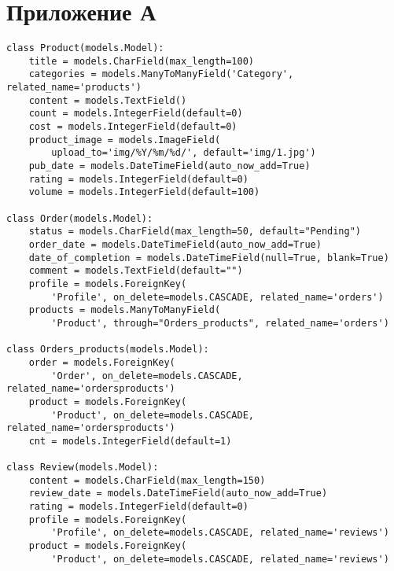\chapter*{Приложение А}

\captionsetup{singlelinecheck = false, justification=raggedright}
\begin{lstlisting}[label=db_create_1,caption=Классы таблиц базы данных(часть 1)]
class Product(models.Model):
    title = models.CharField(max_length=100)
    categories = models.ManyToManyField('Category', related_name='products')
    content = models.TextField()
    count = models.IntegerField(default=0)
    cost = models.IntegerField(default=0)
    product_image = models.ImageField(
        upload_to='img/%Y/%m/%d/', default='img/1.jpg')
    pub_date = models.DateTimeField(auto_now_add=True)
    rating = models.IntegerField(default=0)
    volume = models.IntegerField(default=100)
 
class Order(models.Model):
    status = models.CharField(max_length=50, default="Pending")
    order_date = models.DateTimeField(auto_now_add=True)
    date_of_completion = models.DateTimeField(null=True, blank=True)
    comment = models.TextField(default="")
    profile = models.ForeignKey(
        'Profile', on_delete=models.CASCADE, related_name='orders')
    products = models.ManyToManyField(
        'Product', through="Orders_products", related_name='orders')

class Orders_products(models.Model):
    order = models.ForeignKey(
        'Order', on_delete=models.CASCADE, related_name='ordersproducts')
    product = models.ForeignKey(
        'Product', on_delete=models.CASCADE, related_name='ordersproducts')
    cnt = models.IntegerField(default=1)

class Review(models.Model):
    content = models.CharField(max_length=150)
    review_date = models.DateTimeField(auto_now_add=True)
    rating = models.IntegerField(default=0)
    profile = models.ForeignKey(
        'Profile', on_delete=models.CASCADE, related_name='reviews')
    product = models.ForeignKey(
        'Product', on_delete=models.CASCADE, related_name='reviews')
\end{lstlisting}

\newpage

